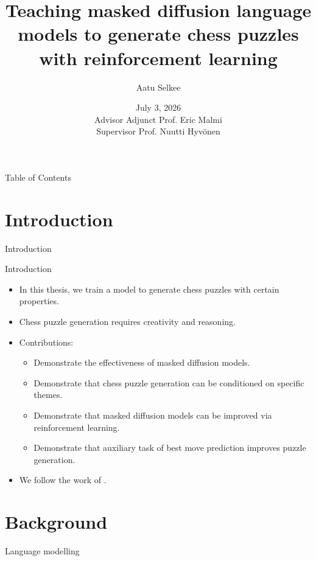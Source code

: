 \documentclass[normaltitle,first=orange,second=red,leqno]{aaltoslides}
\title{Teaching masked diffusion language models to generate chess puzzles with reinforcement learning}
\author[Lyhyt nimi]{Aatu Selkee}
\date{\small{July 3, 2026} \\ Advisor Adjunct Prof. Eric Malmi\\Supervisor Prof. Nuutti Hyv\"onen}
\newcommand{\thesiscolor}{orange}
\begin{document}
\aaltotitleframe

\begin{frame}{Table of Contents}
    \tableofcontents
\end{frame}


\section{Introduction}

\begin{frame}
\begin{center}
\Huge{\color{\thesiscolor} Introduction}
\end{center}
\end{frame}

\begin{frame}{Introduction}
    \begin{itemize}
        \item<1-> In this thesis, we train a model to generate chess puzzles with certain properties.
        \item<2-> Chess puzzle generation requires creativity and reasoning.
        \item<3-> Contributions:
        \begin{itemize}
            \item Demonstrate the effectiveness of masked diffusion models.
            \item Demonstrate that chess puzzle generation can be conditioned on specific themes.
            \item Demonstrate that masked diffusion models can be improved via reinforcement learning.
            \item Demonstrate that auxiliary task of best move prediction improves puzzle generation.
        \end{itemize}
        \item<4-> We follow the work of \citeauthor{feng2025generatingcreativechesspuzzles}.
    \end{itemize}
\end{frame}


\section{Background}

\begin{frame}
\begin{center}
\Huge{\color{\thesiscolor} Language modelling}
\end{center}
\end{frame}
\end{document}
